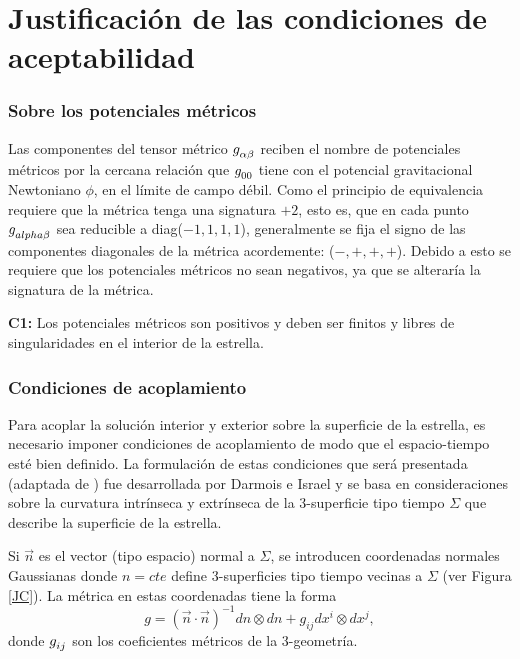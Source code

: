 \chapter{Justificación de las condiciones de aceptabilidad}\label{AceppCon}

\subsection*{Sobre los potenciales métricos}
\noindent Las componentes del tensor métrico $\tensor{g}{_\alpha_\beta}$ reciben el nombre de potenciales métricos por la cercana relación que $\tensor{g}{_0_0}$ tiene con el potencial gravitacional Newtoniano $\phi$, en el límite de campo débil. Como el principio de equivalencia requiere que la métrica tenga una signatura $+2$, esto es, que en cada punto $\tensor{g}{_{alpha}_{\beta}}$ sea reducible a diag($-1,1,1,1$), generalmente se fija el signo de las componentes diagonales de la métrica acordemente: ($-, +, +, +$). Debido a esto se requiere que los potenciales métricos no sean negativos, ya que se alteraría la signatura de la métrica.

\textbf{C1:} Los potenciales métricos son positivos y deben ser finitos y libres de singularidades en el interior de la estrella.
\subsection*{Condiciones de acoplamiento}
\noindent Para acoplar la solución interior y exterior sobre la superficie de la estrella, es necesario imponer condiciones de acoplamiento de modo que el espacio-tiempo esté bien definido. 
La formulación de estas condiciones que será presentada (adaptada de \cite{Misner1973}) fue desarrollada por Darmois \cite{Darmois1927} e Israel \cite{Israel1966} y se basa en consideraciones sobre la curvatura intrínseca y extrínseca de la 3-superficie tipo tiempo $\Sigma$ que describe la superficie de la estrella.
 
 Si $\vec{n}$ es el vector (tipo espacio) normal a $\Sigma$, se introducen coordenadas normales Gaussianas donde $n=cte$ define 3-superficies tipo tiempo vecinas a $\Sigma$ (ver Figura \ref{JC}). La métrica en estas coordenadas tiene la forma 
 \begin{equation}
g=(\vec{n} \cdot \vec{n})^{-1} d n\otimes d n +g_{i j} d x^{i} \otimes d x^{j},
\end{equation}
donde $\tensor{g}{_i_j}$ son los coeficientes métricos de la 3-geometría.  

